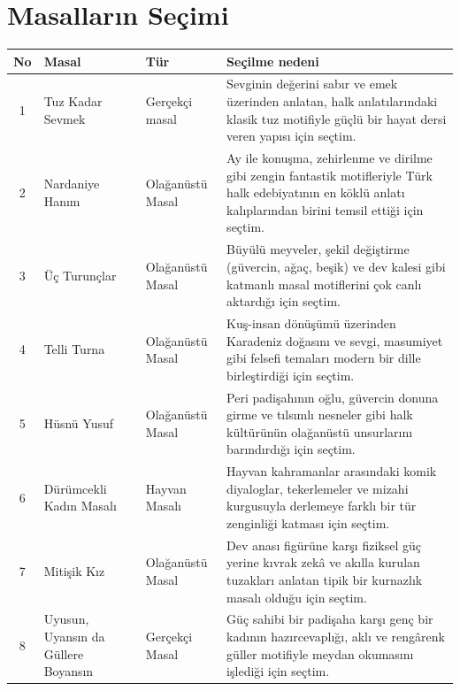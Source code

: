 \documentclass[12pt,a4paper]{article}
\begin{document}
\section{Masalların Seçimi}

\begin{longtable}{@{} c >{\raggedright\arraybackslash}p{3.2cm} >{\raggedright\arraybackslash}p{2.6cm} >{\raggedright\arraybackslash}p{7.8cm} @{}}
\toprule
\textbf{No} & \textbf{Masal} & \textbf{Tür} & \textbf{Seçilme nedeni} \\
\midrule
\endhead
1 & Tuz Kadar Sevmek & Gerçekçi masal & Sevginin değerini sabır ve emek üzerinden anlatan, halk anlatılarındaki klasik tuz motifiyle güçlü bir hayat dersi veren yapısı için seçtim. \\
2 & Nardaniye Hanım & Olağanüstü Masal & Ay ile konuşma, zehirlenme ve dirilme gibi zengin fantastik motifleriyle Türk halk edebiyatının en köklü anlatı kalıplarından birini temsil ettiği için seçtim. \\
3 & Üç Turunçlar & Olağanüstü Masal & Büyülü meyveler, şekil değiştirme (güvercin, ağaç, beşik) ve dev kalesi gibi katmanlı masal motiflerini çok canlı aktardığı için seçtim. \\
4 & Telli Turna & Olağanüstü Masal & Kuş-insan dönüşümü üzerinden Karadeniz doğasını ve sevgi, masumiyet gibi felsefi temaları modern bir dille birleştirdiği için seçtim. \\
5 & Hüsnü Yusuf & Olağanüstü Masal & Peri padişahının oğlu, güvercin donuna girme ve tılsımlı nesneler gibi halk kültürünün olağanüstü unsurlarını barındırdığı için seçtim. \\
6 & Dürümcekli Kadın Masalı & Hayvan Masalı & Hayvan kahramanlar arasındaki komik diyaloglar, tekerlemeler ve mizahi kurgusuyla derlemeye farklı bir tür zenginliği katması için seçtim. \\
7 & Mitişik Kız & Olağanüstü Masal & Dev anası figürüne karşı fiziksel güç yerine kıvrak zekâ ve akılla kurulan tuzakları anlatan tipik bir kurnazlık masalı olduğu için seçtim. \\
8 & Uyusun, Uyansın da Güllere Boyansın & Gerçekçi Masal & Güç sahibi bir padişaha karşı genç bir kadının hazırcevaplığı, aklı ve rengârenk güller motifiyle meydan okumasını işlediği için seçtim. \\
\bottomrule
\end{longtable}

\end{document}
